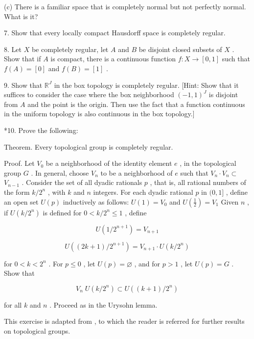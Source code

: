 (c) There is a familiar space that is completely normal but not perfectly normal. What is it?

7. Show that every locally compact Hausdorff space is completely regular.

8. Let \(X\) be completely regular, let \(A\) and \(B\) be disjoint closed subsets of \(X\) . Show that if \(A\) is compact, there is a continuous function \(f : X \rightarrow  \left\lbrack  {0,1}\right\rbrack\) such that \(f\left( A\right)  = \left\lbrack  0\right\rbrack\) and \(f\left( B\right)  = \left\lbrack  1\right\rbrack\) .

9. Show that \({\mathbb{R}}^{J}\) in the box topology is completely regular. [Hint: Show that it suffices to consider the case where the box neighborhood \({\left( -1,1\right) }^{J}\) is disjoint from \(A\) and the point is the origin. Then use the fact that a function continuous in the uniform topology is also continuous in the box topology.]

*10. Prove the following:

Theorem. Every topological group is completely regular.

Proof. Let \({V}_{0}\) be a neighborhood of the identity element \(e\) , in the topological group \(G\) . In general, choose \({V}_{n}\) to be a neighborhood of \(e\) such that \({V}_{n} \cdot  {V}_{n} \subset\)  \({V}_{n - 1}\) . Consider the set of all dyadic rationals \(p\) , that is, all rational numbers of the form \(k/{2}^{n}\) , with \(k\) and \(n\) integers. For each dyadic rational \(p\) in \((0,1\rbrack\) , define an open set \(U\left( p\right)\) inductively as follows: \(U\left( 1\right)  = {V}_{0}\) and \(U\left( \frac{1}{2}\right)  = {V}_{1}\) Given \(n\) , if \(U\left( {k/{2}^{n}}\right)\) is defined for \(0 < k/{2}^{n} \leq  1\) , define

\[
U\left( {1/{2}^{n + 1}}\right)  = {V}_{n + 1}
\]

\[
U\left( {\left( {{2k} + 1}\right) /{2}^{n + 1}}\right)  = {V}_{n + 1} \cdot  U\left( {k/{2}^{n}}\right)
\]

for \(0 < k < {2}^{n}\) . For \(p \leq  0\) , let \(U\left( p\right)  = \varnothing\) , and for \(p > 1\) , let \(U\left( p\right)  = G\) . Show that

\[
{V}_{n}\;U\left( {k/{2}^{n}}\right)  \subset  U\left( {\left( {k + 1}\right) /{2}^{n}}\right)
\]

for all \(k\) and \(n\) . Proceed as in the Urysohn lemma.

This exercise is adapted from 		\cite{MontgomeryZippin1955}, to which the reader is referred for further results on topological groups.

